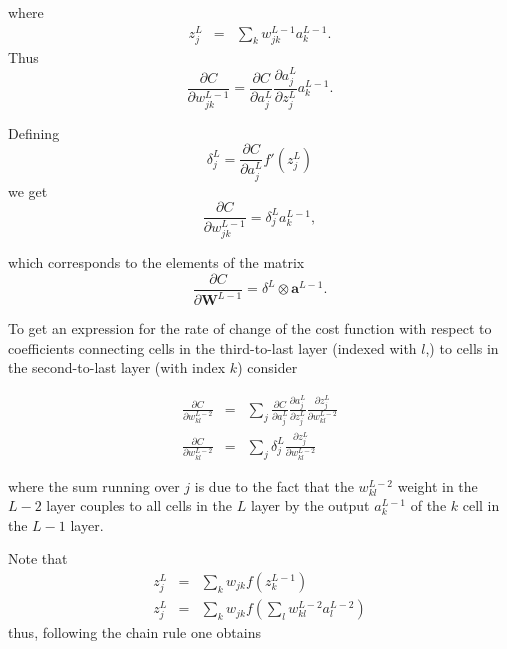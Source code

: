 \documentclass[11pt,onecolumn]{article}
\begin{document}
where 
\begin{eqnarray}
    z^{L}_j &=& \sum_k w_{jk}^{L-1} a^{L-1}_k. 
\end{eqnarray}  
Thus 
\begin{equation}
    \frac{\partial C}{\partial w^{L-1}_{jk}} =  \frac{\partial C}{\partial a^{L}_j} 
                                               \frac{\partial a^{L}_j}{\partial z^{L}_j}
                                               a^{L-1}_k.
\end{equation}

Defining 
\begin{equation}
    \delta_j^{L} = \frac{\partial C}{\partial a^{L}_j} f'(z^{L}_j)
\end{equation}
we get 
\begin{equation}
    \frac{\partial C}{\partial w^{L-1}_{jk}} =  \delta_j^{L} a^{L-1}_k ,
\end{equation}    

which corresponds to the elements of the matrix 
\begin{equation}
    \frac{\partial C}{\partial \mathbf{W}^{L-1}} = \delta^{L} \otimes \mathbf{a}^{L-1}. 
\end{equation}

To get an expression for the rate of change of the cost function with respect to coefficients 
connecting cells in the third-to-last layer (indexed with $l$,) to cells
in the second-to-last layer (with index $k$) consider 

\begin{eqnarray}
    \frac{\partial C}{\partial w^{L-2}_{kl}} &=& \sum_j \frac{\partial C}{\partial a^{L}_j} 
                                               \frac{\partial a^{L}_j}{\partial z^{L}_j}
                                               \frac{\partial z^{L}_j}{\partial w_{kl}^{L-2} } \\
    \frac{\partial C}{\partial w^{L-2}_{kl}} &=& \sum_j \delta_j^{L}  \frac{\partial z^{L}_j}{\partial w_{kl}^{L-2} }                                         
\end{eqnarray}    


where the sum running over $j$ is due to the fact that the $ w^{L-2}_{kl} $ weight
in the $L-2$ layer couples to all cells in the $L$ layer by the output $a^{L-1}_k$ of the $k$ cell 
in the $L-1$ layer.   

Note that 
\begin{eqnarray}
    z^{L}_j &=& \sum_k w_{jk}f(z^{L-1}_k) \\ 
    z^{L}_j &=& \sum_k w_{jk}f(\sum_l w_{kl}^{L-2} a^{L-2}_l)
\end{eqnarray}    
thus, following the chain rule one obtains
\end{document}
